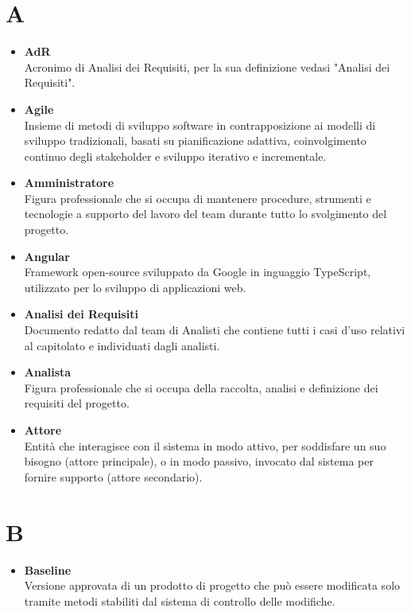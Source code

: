 \documentclass[a4paper,12pt]{article}
\begin{document}
        \section*{A} {
            \begin{itemize}
                \item \textbf{AdR}\\
                    Acronimo di Analisi dei Requisiti, per la sua definizione vedasi "Analisi dei Requisiti".
                \item \textbf{Agile}\\
                    Insieme di metodi di sviluppo software in contrapposizione ai modelli di sviluppo tradizionali, basati su pianificazione adattiva, coinvolgimento continuo degli stakeholder e sviluppo iterativo e incrementale.
                \item \textbf{Amministratore}\\
                    Figura professionale che si occupa di mantenere procedure, strumenti e tecnologie a supporto del lavoro del team durante tutto lo svolgimento del progetto.
                \item \textbf{Angular}\\
                    Framework open-source sviluppato da Google in inguaggio TypeScript, utilizzato per lo sviluppo di applicazioni web.
                \item \textbf{Analisi dei Requisiti}\\
                    Documento redatto dal team di Analisti che contiene tutti i casi d'uso relativi al capitolato e individuati dagli analisti.
                \item \textbf{Analista}\\
                    Figura professionale che si occupa della raccolta, analisi e definizione dei requisiti del progetto.
                \item \textbf{Attore}\\
                    Entità che interagisce con il sistema in modo attivo, per soddisfare un suo bisogno (attore principale), o in modo passivo, invocato dal sistema per fornire supporto (attore secondario).
            \end{itemize}
        }
        \newpage

        \section*{B} {
            \begin{itemize}
                \item \textbf{Baseline}\\
                    Versione approvata di un prodotto di progetto che può essere modificata solo tramite metodi stabiliti dal sistema di controllo delle modifiche.
            \end{itemize}
        }
        \newpage
\end{document}
